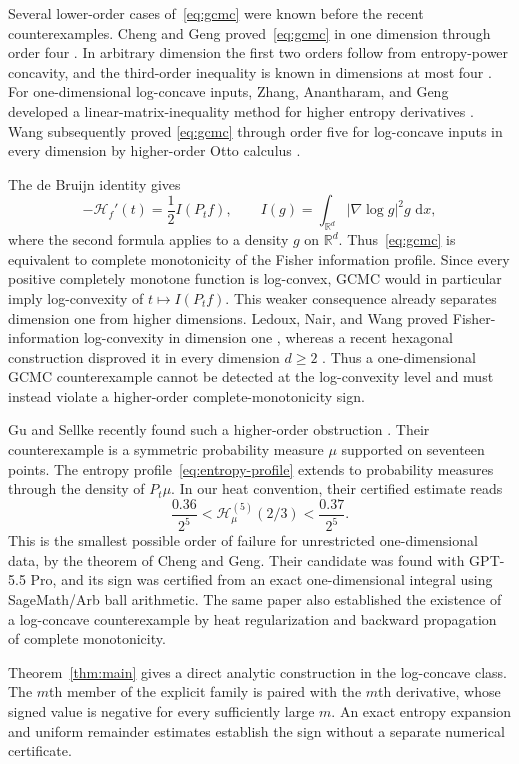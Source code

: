 \documentclass[10pt,letterpaper,journal]{IEEEtran}
\newcommand{\R}{\mathbb{R}}
\newcommand{\cH}{\mathcal{H}}
\newcommand{\dd}{\,\mathrm{d}}
\theoremstyle{plain}
\theoremstyle{definition}
\begin{document}
Several lower-order cases of~\eqref{eq:gcmc} were known before the recent
counterexamples.  Cheng
and Geng proved~\eqref{eq:gcmc} in one dimension through order four
\cite{ChengGeng2015}.  In arbitrary dimension the first two orders follow
from entropy-power concavity, and the third-order inequality is known in
dimensions at most four \cite{GuoYuanGao2022}.  For one-dimensional
log-concave inputs, Zhang, Anantharam, and Geng developed a
linear-matrix-inequality method for higher entropy derivatives
\cite{ZhangAnantharamGeng2018}.  Wang subsequently proved
\eqref{eq:gcmc} through order five for log-concave inputs in every dimension
by higher-order Otto calculus \cite{Wang2025Otto}.

The de Bruijn identity gives
\[
 -\cH_f'(t)=\frac12 I(P_tf),
 \qquad
 I(g)=\int_{\R^d}|\nabla\log g|^2g\,\dd x,
\]
where the second formula applies to a density $g$ on $\R^d$.
Thus~\eqref{eq:gcmc} is equivalent to complete monotonicity of the Fisher
information profile. Since every positive completely monotone function is
log-convex, GCMC would in particular imply log-convexity of
$t\mapsto I(P_tf)$. This weaker consequence already separates dimension one
from higher dimensions. Ledoux, Nair, and Wang proved Fisher-information
log-convexity in dimension one \cite{LedouxNairWang2021}, whereas a recent
hexagonal construction disproved it in every dimension $d\ge2$
\cite{ZouFanGaoWang2026}. Thus a one-dimensional GCMC counterexample cannot be
detected at the log-convexity level and must instead violate a higher-order
complete-monotonicity sign.

Gu and Sellke recently found such a higher-order obstruction
\cite{GuSellke2026}. Their counterexample is a symmetric probability measure
$\mu$ supported on seventeen points. The entropy profile~\eqref{eq:entropy-profile}
extends to probability measures through the density of $P_t\mu$. In our heat
convention, their certified estimate reads
\[
 \frac{0.36}{2^5}<\cH_\mu^{(5)}(2/3)<\frac{0.37}{2^5}.
\]
This is the smallest possible order of failure for unrestricted
one-dimensional data, by the theorem of Cheng and Geng. Their candidate was
found with GPT-5.5 Pro, and its sign was certified from an exact
one-dimensional integral using SageMath/Arb ball arithmetic. The same paper
also established the existence of a log-concave counterexample by heat
regularization and backward propagation of complete monotonicity.

Theorem~\ref{thm:main} gives a direct analytic construction in the log-concave
class. The $m$th member of the explicit family is paired with the $m$th
derivative, whose signed value is negative for every sufficiently large $m$.
An exact entropy expansion and uniform remainder estimates establish the sign
without a separate numerical certificate.
\end{document}
